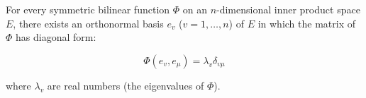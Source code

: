 For every symmetric bilinear function $\Phi$ on an $n$-dimensional inner product space $E$, there exists an orthonormal basis $e_v$ ($v = 1, \ldots, n$) of $E$ in which the matrix of $\Phi$ has diagonal form:

$$\Phi(e_v, e_\mu) = \lambda_v \delta_{v\mu}$$

where $\lambda_v$ are real numbers (the eigenvalues of $\Phi$).
